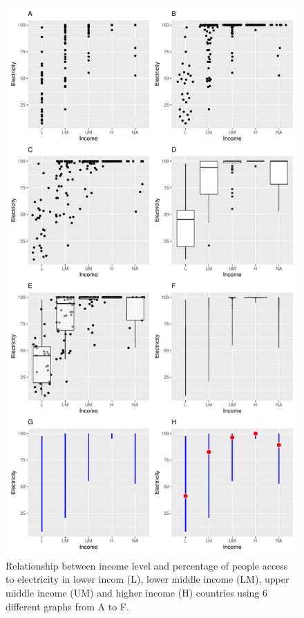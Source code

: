\documentclass[
  letterpaper,
  DIV=11,
  numbers=noendperiod]{scrreprt}
\begin{document}
\begin{figure}[H]

{\centering \includegraphics{preface_files/figure-pdf/unnamed-chunk-1-1.pdf}

}

\caption{Relationship between income level and percentage of people
access to electricity in lower incom (L), lower middle income (LM),
upper middle income (UM) and higher income (H) countries using 6
different graphs from A to F.}

\end{figure}%
\end{document}
